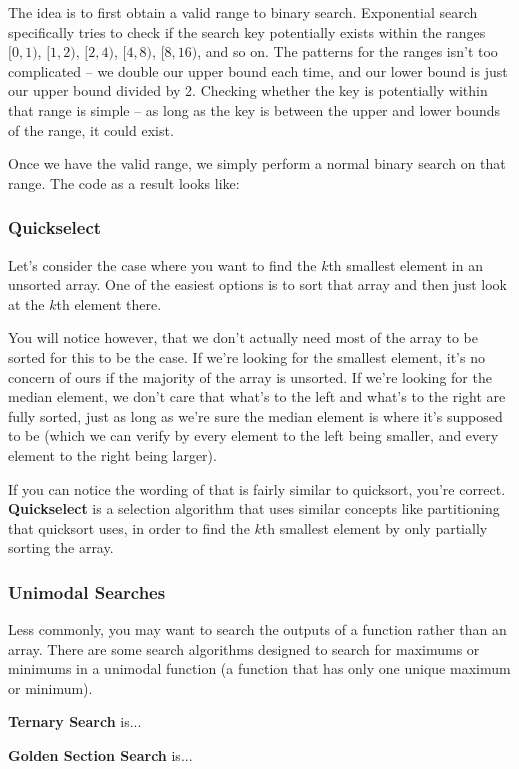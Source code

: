 The idea is to first obtain a valid range to binary search. Exponential search specifically tries to check if the search key potentially exists within the ranges $[0,1)$, $[1,2)$, $[2,4)$, $[4,8)$, $[8,16)$, and so on. The patterns for the ranges isn't too complicated -- we double our upper bound each time, and our lower bound is just our upper bound divided by 2. Checking whether the key is potentially within that range is simple -- as long as the key is between the upper and lower bounds of the range, it could exist.

Once we have the valid range, we simply perform a normal binary search on that range. The code as a result looks like:


\subsubsection{Quickselect}

Let's consider the case where you want to find the $k$th smallest element in an unsorted array. One of the easiest options is to sort that array and then just look at the $k$th element there.

You will notice however, that we don't actually need most of the array to be sorted for this to be the case. If we're looking for the smallest element, it's no concern of ours if the majority of the array is unsorted. If we're looking for the median element, we don't care that what's to the left and what's to the right are fully sorted, just as long as we're sure the median element is where it's supposed to be (which we can verify by every element to the left being smaller, and every element to the right being larger).

If you can notice the wording of that is fairly similar to quicksort, you're correct. \textbf{Quickselect} is a selection algorithm that uses similar concepts like partitioning that quicksort uses, in order to find the $k$th smallest element by only partially sorting the array.

\subsubsection{Unimodal Searches}

Less commonly, you may want to search the outputs of a function rather than an array. There are some search algorithms designed to search for maximums or minimums in a unimodal function (a function that has only one unique maximum or minimum).

\textbf{Ternary Search}  is...

\textbf{Golden Section Search}  is...